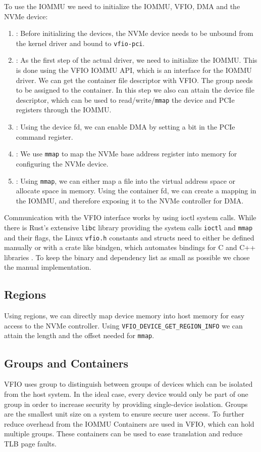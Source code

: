 To use the IOMMU we need to initialize the IOMMU, VFIO, DMA and the NVMe device:
\begin{enumerate}
    \item \textbf{}: Before initializing the devices, the NVMe device needs to be unbound from the kernel driver and bound to \texttt{vfio-pci}.
    \item \textbf{}: As the first step of the actual driver, we need to initialize the IOMMU. This is done using the VFIO IOMMU API, which is an interface for the IOMMU driver. We can get the container file descriptor with VFIO. The group needs to be assigned to the container. In this step we also can attain the device file descriptor, which can be used to read/write/\texttt{mmap} the device and PCIe registers through the IOMMU.
    \item \textbf{}: Using the device fd, we can enable DMA by setting a bit in the PCIe command register.
    \item \textbf{}: We use \texttt{mmap} to map the NVMe base address register into memory for configuring the NVMe device.
    \item \textbf{}: Using \texttt{mmap}, we can either map a file into the virtual address space or allocate space in memory. Using the container fd, we can create a mapping in the IOMMU, and therefore exposing it to the NVMe controller for DMA.
\end{enumerate}

Communication with the VFIO interface works by using ioctl system calls.
While there is Rust's extensive \texttt{libc} library providing the system calls \texttt{ioctl} and \texttt{mmap} and their flags, the Linux \texttt{vfio.h} constants and structs need to either be defined manually or with a crate like bindgen, which automates bindings for C and C++ libraries \cite{cratebindgen}. To keep the binary and dependency list as small as possible we chose the manual implementation.

\subsection{Regions}
Using regions, we can directly map device memory into host memory for easy access to the NVMe controller.
Using \texttt{VFIO\_DEVICE\_GET\_REGION\_INFO} we can attain the length and the offset needed for \texttt{mmap}.

\subsection{Groups and Containers}
VFIO uses group to distinguish between groups of devices which can be isolated from the host system. In the ideal case, every device would only be part of one group in order to increase security by providing single-device isolation. Groups are the smallest unit size on a system to ensure secure user access.
To further reduce overhead from the IOMMU Containers are used in VFIO, which can hold multiple groups. These containers can be used to ease translation and reduce TLB page faults.

